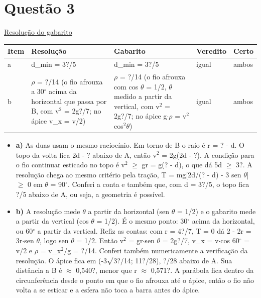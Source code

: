 \documentclass{article}%
\begin{document}
\section*{Questão 3}%
\href{https://poliedroresolve.sistemapoliedro.com.br/vestibulares/ime/2026/ime-2-fase-dia-2-24-10-2025-2-fase-dia-2/dissertativa-3-fisica-2-fase-dia-2-ime-2026}{Resolução do gabarito}\par\smallskip%
\begin{longtable}{@{}p{} p{} p{} p{} p{}@{}}\toprule Item & Resolução & Gabarito & Veredito & Certo \\ \midrule
a & d\_min = 3?/5 & d\_min = 3?/5 & igual & ambos \\
b & $\rho$ = ?/14 (o fio afrouxa a 30$^\circ$ acima da horizontal que passa por B, com v$^2$ = 2g?/7; no ápice v\_x = v/2) & $\rho$ = ?/14 (o fio afrouxa com cos $\theta$ = 1/2, $\theta$ medido a partir da vertical, com v$^2$ = 2g?/7; no ápice g$\cdot$$\rho$ = v$^2$cos$^2$$\theta$) & igual & ambos \\
\bottomrule\end{longtable}%
\begin{itemize}%
\item%
\textbf{a)} As duas usam o mesmo raciocínio. Em torno de B o raio é r = ? - d. O topo da volta fica 2d - ? abaixo de A, então v$^2$ = 2g(2d - ?). A condição para o fio continuar esticado no topo é v$^2$ $\geq$ gr = g(? - d), o que dá 5d $\geq$ 3?. A resolução chega ao mesmo critério pela tração, T = mg{[}2d/(? - d) - 3 sen $\theta${]} $\geq$ 0 em $\theta$ = 90$^\circ$. Conferi a conta e também que, com d = 3?/5, o topo fica ?/5 abaixo de A, ou seja, a geometria é possível.%
\item%
\textbf{b)} A resolução mede $\theta$ a partir da horizontal (sen $\theta$ = 1/2) e o gabarito mede a partir da vertical (cos $\theta$ = 1/2). É o mesmo ponto: 30$^\circ$ acima da horizontal, ou 60$^\circ$ a partir da vertical. Refiz as contas: com r = 4?/7, T = 0 dá 2 - 2r = 3r$\cdot$sen $\theta$, logo sen $\theta$ = 1/2. Então v$^2$ = gr$\cdot$sen $\theta$ = 2g?/7, v\_x = v$\cdot$cos 60$^\circ$ = v/2 e $\rho$ = v\_x$^2$/g = ?/14. Conferi também numericamente a verificação da resolução. O ápice fica em (-3$\surd$3?/14; 11?/28), ?/28 abaixo de A. Sua distância a B é $\approx$ 0,540?, menor que r $\approx$ 0,571?. A parábola fica dentro da circunferência desde o ponto em que o fio afrouxa até o ápice, então o fio não volta a se esticar e a esfera não toca a barra antes do ápice.%
\end{itemize}%
\end{document}
